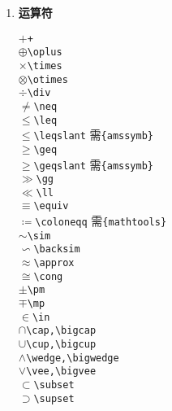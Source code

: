 \documentclass{article}
\newcommand{\q}{\quad}
\begin{document}
\begin{multicols}{2}
\begin{enumerate}
        \item \textbf{运算符}
              \vspace{-5mm}
              \begin{multicols}{2}
                  $ + $\q \verb|+| \\
                  $ \oplus $\q \verb|\oplus|\\
                  $ \times $\q \verb|\times| \\
                  $ \otimes $\q \verb|\otimes| \\
                  $ \div $\q \verb|\div| \\
                  $ \neq $\q \verb|\neq| \\
                  $ \leq $\q \verb|\leq| \\
                  $ \leqslant $\q \verb|\leqslant| {\footnotesize 需\verb|{amssymb}|} \\
                  $ \geq $\q \verb|\geq| \\
                  $ \geqslant $\q \verb|\geqslant| {\footnotesize 需\verb|{amssymb}|} \\
                  $ \gg $\q \verb|\gg| \\
                  $ \ll $\q \verb|\ll| \\
                  $ \equiv $\q \verb|\equiv| \\
                  $ \coloneqq $\q \verb|\coloneqq| {\footnotesize 需\verb|{mathtools}|} \\
                  $ \sim $\q \verb|\sim| \\
                  $ \backsim $\q \verb|\backsim| \\
                  $ \approx $\q \verb|\approx| \\
                  $ \cong $\q \verb|\cong| \\
                  $ \pm $\q \verb|\pm| \\
                  $ \mp $\q \verb|\mp| \\
                  $ \in $\q \verb|\in| \\
                  $ \cap $\q \verb|\cap,\bigcap| \\
                  $ \cup $\q \verb|\cup,\bigcup| \\
                  $ \wedge $\q \verb|\wedge,\bigwedge| \\
                  $ \vee $\q \verb|\vee,\bigvee| \\
                  $ \subset $\q \verb|\subset| \\
                  $ \supset $\q \verb|\supset| \\

\end{multicols}
\end{enumerate}
\end{multicols}
\end{document}
